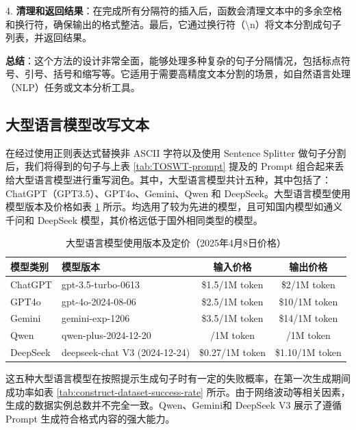 4. \textbf{清理和返回结果}：在完成所有分隔符的插入后，函数会清理文本中的多余空格和换行符，确保输出的格式整洁。最后，它通过换行符（\textbackslash{}n）将文本分割成句子列表，并返回结果。

\textbf{总结}：这个方法的设计非常全面，能够处理多种复杂的句子分隔情况，包括标点符号、引号、括号和缩写等。它适用于需要高精度文本分割的场景，如自然语言处理（NLP）任务或文本分析工具。

\subsection{大型语言模型改写文本}
\label{sec:TOSWT-gen-llm}

在经过使用正则表达式替换非 ASCII 字符以及使用 Sentence Splitter 做句子分割后，我们将得到的句子与上表 \ref{tab:TOSWT-prompt} 提及的 Prompt 组合起来丢给大型语言模型进行重写润色。其中，大型语言模型共计五种，其中包括了：ChatGPT（GPT3.5）、GPT4o、Gemini、Qwen 和 DeepSeek。大型语言模型使用模型版本及价格如表 \ref{tab:TOSWT-llmcost} 所示。均选用了较为先进的模型，且可知国内模型如通义千问和 DeepSeek 模型，其价格远低于国外相同类型的模型。

\begin{table}[htbp]
\centering
\caption{大型语言模型使用版本及定价（2025年4月8日价格）} \label{tab:TOSWT-llmcost}
\begin{tabular}{llcc}
\toprule
\textbf{模型类别} & \textbf{模型版本}                 & \textbf{输入价格}  & \textbf{输出价格}  \\ \midrule
ChatGPT       & gpt-3.5-turbo-0613            & \$1.5/1M token  & \$2/1M token    \\
GPT4o         & gpt-4o-2024-08-06             & \$2.5/1M token  & \$10/1M token   \\
Gemini        & gemini-exp-1206               & \$3.5/1M token  & \$14/1M token   \\
Qwen          & qwen-plus-2024-12-20          & \textyen 0.8/1M token  & \textyen 2/1M token    \\
DeepSeek      & deepseek-chat V3 (2024-12-24) & \$0.27/1M token & \$1.10/1M token \\ \bottomrule
\end{tabular}
\end{table}

这五种大型语言模型在按照提示生成句子时有一定的失败概率，在第一次生成期间成功率如表 \ref {tab:construct-dataset-success-rate} 所示。由于网络波动等相关因素，生成的数据实例总数并不完全一致。Qwen、Gemini和 DeepSeek V3 展示了遵循 Prompt 生成符合格式内容的强大能力。

